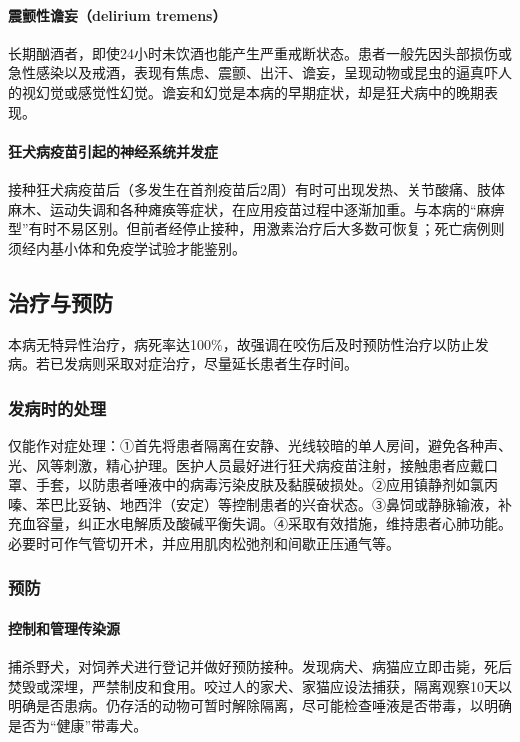 \paragraph{震颤性谵妄（delirium tremens）}

长期酗酒者，即使24小时未饮酒也能产生严重戒断状态。患者一般先因头部损伤或急性感染以及戒酒，表现有焦虑、震颤、出汗、谵妄，呈现动物或昆虫的逼真吓人的视幻觉或感觉性幻觉。谵妄和幻觉是本病的早期症状，却是狂犬病中的晚期表现。

\paragraph{狂犬病疫苗引起的神经系统并发症}

接种狂犬病疫苗后（多发生在首剂疫苗后2周）有时可出现发热、关节酸痛、肢体麻木、运动失调和各种瘫痪等症状，在应用疫苗过程中逐渐加重。与本病的“麻痹型”有时不易区别。但前者经停止接种，用激素治疗后大多数可恢复；死亡病例则须经内基小体和免疫学试验才能鉴别。

\subsection{治疗与预防}

本病无特异性治疗，病死率达100\%，故强调在咬伤后及时预防性治疗以防止发病。若已发病则采取对症治疗，尽量延长患者生存时间。

\subsubsection{发病时的处理}

仅能作对症处理：①首先将患者隔离在安静、光线较暗的单人房间，避免各种声、光、风等刺激，精心护理。医护人员最好进行狂犬病疫苗注射，接触患者应戴口罩、手套，以防患者唾液中的病毒污染皮肤及黏膜破损处。②应用镇静剂如氯丙嗪、苯巴比妥钠、地西泮（安定）等控制患者的兴奋状态。③鼻饲或静脉输液，补充血容量，纠正水电解质及酸碱平衡失调。④采取有效措施，维持患者心肺功能。必要时可作气管切开术，并应用肌肉松弛剂和间歇正压通气等。

\subsubsection{预防}

\paragraph{控制和管理传染源}

捕杀野犬，对饲养犬进行登记并做好预防接种。发现病犬、病猫应立即击毙，死后焚毁或深埋，严禁制皮和食用。咬过人的家犬、家猫应设法捕获，隔离观察10天以明确是否患病。仍存活的动物可暂时解除隔离，尽可能检查唾液是否带毒，以明确是否为“健康”带毒犬。

